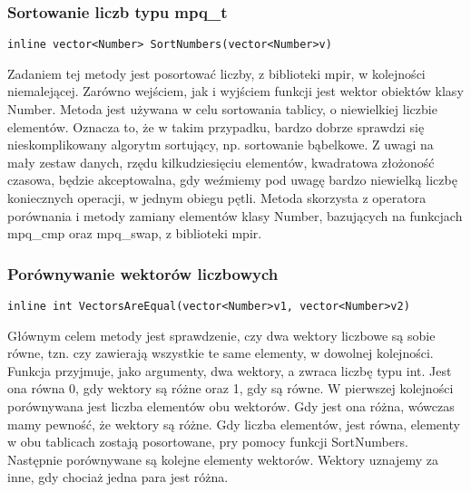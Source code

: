 \documentclass[twoside,a4paper]{book}
\begin{document}
\subsubsection{Sortowanie liczb typu mpq\_t}
\begin{lstlisting}
inline vector<Number> SortNumbers(vector<Number>v)
\end{lstlisting}
Zadaniem tej metody jest posortować liczby, z biblioteki mpir, w kolejności niemalejącej. Zarówno wejściem, jak i wyjściem funkcji jest wektor obiektów klasy Number. Metoda jest używana w celu sortowania tablicy, o niewielkiej liczbie elementów. Oznacza to, że w takim przypadku, bardzo dobrze sprawdzi się nieskomplikowany algorytm sortujący, np. sortowanie bąbelkowe. Z uwagi na mały zestaw danych, rzędu kilkudziesięciu elementów, kwadratowa złożoność czasowa, będzie akceptowalna, gdy weźmiemy pod uwagę bardzo niewielką liczbę koniecznych operacji, w jednym obiegu pętli. Metoda skorzysta z operatora porównania i metody zamiany elementów klasy Number, bazujących na funkcjach mpq\_cmp oraz mpq\_swap, z biblioteki mpir.
\\

\subsubsection{Porównywanie wektorów liczbowych}
\begin{lstlisting}
inline int VectorsAreEqual(vector<Number>v1, vector<Number>v2)
\end{lstlisting}
Głównym celem metody jest sprawdzenie, czy dwa wektory liczbowe są sobie równe, tzn. czy zawierają wszystkie te same elementy, w dowolnej kolejności. Funkcja przyjmuje, jako argumenty, dwa wektory, a zwraca liczbę typu int. Jest ona równa 0, gdy wektory są różne oraz 1, gdy są równe. W pierwszej kolejności porównywana jest liczba elementów obu wektorów. Gdy jest ona różna, wówczas mamy pewność, że wektory są różne. Gdy liczba elementów, jest równa, elementy w obu tablicach zostają posortowane, pry pomocy funkcji SortNumbers. Następnie porównywane są kolejne elementy wektorów. Wektory uznajemy za inne, gdy chociaż jedna para jest różna.
\\
\end{document}
